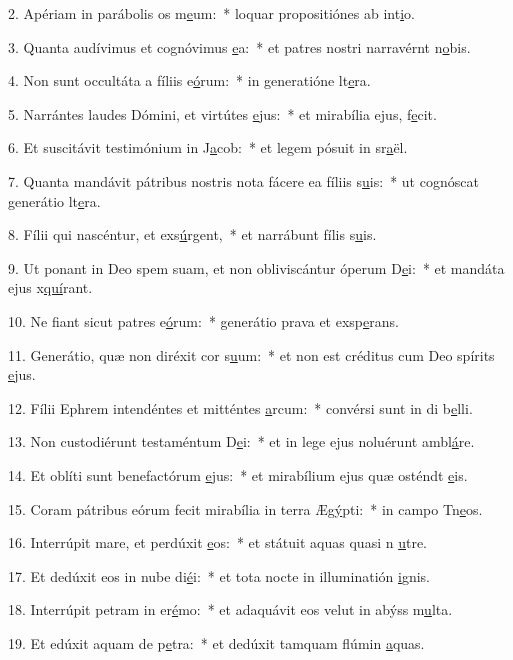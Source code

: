 2. Apériam in parábolis os m\uline{e}um:~* loquar propositiónes ab int\uline{i}o.\par 
3. Quanta audívimus et cognóvimus \uline{e}a:~* et patres nostri narravérnt n\uline{o}bis.\par 
4. Non sunt occultáta a fíliis e\uline{ó}rum:~* in generatióne lt\uline{e}ra.\par 
5. Narrántes laudes Dómini, et virtútes \uline{e}jus:~* et mirabília ejus,  f\uline{e}cit.\par 
6. Et suscitávit testimónium in J\uline{a}cob:~* et legem pósuit in sr\uline{a}ël.\par 
7. Quanta mandávit pátribus nostris nota fácere ea fíliis s\uline{u}is:~* ut cognóscat generátio lt\uline{e}ra.\par 
8. Fílii qui nascéntur, et exs\uline{ú}rgent,~* et narrábunt fílis s\uline{u}is.\par 
9. Ut ponant in Deo spem suam, et non obliviscántur óperum D\uline{e}i:~* et mandáta ejus x\uline{quí}rant.\par 
10. Ne fiant sicut patres e\uline{ó}rum:~* generátio prava et exsp\uline{e}rans.\par 
11. Generátio, quæ non diréxit cor s\uline{u}um:~* et non est créditus cum Deo spírits \uline{e}jus.\par 
12. Fílii Ephrem intendéntes et mitténtes \uline{a}rcum:~* convérsi sunt in di b\uline{e}lli.\par 
13. Non custodiérunt testaméntum D\uline{e}i:~* et in lege ejus noluérunt ambl\uline{á}re.\par 
14. Et oblíti sunt benefactórum \uline{e}jus:~* et mirabílium ejus quæ osténdt \uline{e}is.\par 
15. Coram pátribus eórum fecit mirabília in terra Æg\uline{ý}pti:~* in campo Tn\uline{e}os.\par 
16. Interrúpit mare, et perdúxit \uline{e}os:~* et státuit aquas quasi n \uline{u}tre.\par 
17. Et dedúxit eos in nube di\uline{é}i:~* et tota nocte in illuminatión \uline{i}gnis.\par 
18. Interrúpit petram in er\uline{é}mo:~* et adaquávit eos velut in abýss m\uline{u}lta.\par 
19. Et edúxit aquam de p\uline{e}tra:~* et dedúxit tamquam flúmin \uline{a}quas.\par 
